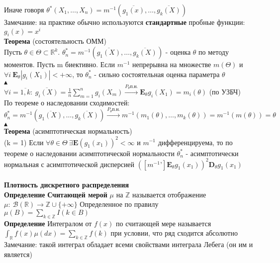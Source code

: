 \documentclass[25pt]{article}
\begin{document}
Иначе говоря $\theta^*(X_1,\dots,X_n) = m^{-1}(\overline{g_1(x)},\dots,\overline{g_k(X)})$\\
Замечание: на практике обычно используются \textbf{стандартные} пробные функции: $g_i(x) = x^i$\\
\textbf{Теорема} (состоятельность ОММ)\\
Пусть $\theta \in \Theta \subset \mathbb{R}^k$. $\theta^*_n = m^{-1}(\overline{g_1(X)},\dots,\overline{g_k(X)})$ - оценка $\theta$ по методу моментов.
Пусть m биективно. Если $m^{-1}$ непрерывна на множестве $m(\Theta)$ и $\forall i \ \textbf{E}_\theta |g_i(X_1)| < +\infty$, то $\theta^*_n$ - сильно состоятельная оценка параметра $\theta$
\\
$\blacktriangle$
\\
$\forall i = \overline{1,k}:\ \overline{g_i(X)} = \frac{1}{n}\sum_{m=1}^n g_i(X_m) \xrightarrow{P_\theta \text{п.н.}} \textbf{E}_\theta g_i(X_1) = m_i(\theta)$ (по УЗБЧ)\\
По теореме о наследовании сходимостей:\\
$\theta_n^* = m^{-1}(\overline{g_1(X)},\dots,\overline{g_k(X)}) \xrightarrow{P_\theta \text{п.н.}} m^{-1}(m_1(\theta),\dots,m_k(\theta)) = m^{-1}(m(\theta)) = \theta$
\\
$\blacktriangle$\\
\textbf{Теорема} (асимптотическая нормальность)\\
(k = 1) Если $\forall \theta \in \Theta \ \exists \textbf{E}(g_1(x_1))^2 < \infty$ и $m^{-1}$ 
дифференцируема, то по теореме о наследовании асимптотической нормальности $\theta_n^*$ - асимптотически нормальная с асимптотической дисперсией 
$ ( [ m^{-1} \text{'}]\mathbf{E}_\theta g_1(x_1))^2 \mathbf{D}_\theta g_1(x_1)$ 
\\ \\
\textbf{Плотность дискретного распределения}\\
\textbf{Определение} \textbf{Считающей мерой} $\mu$ на $\mathbb{Z}$ называется отображение
\\$\mu:\ \mathcal{B}(\mathbb{R}) \rightarrow \mathbb{Z}\cup\{+\infty\}$
Определенное по правилу\\
$\mu(B) = \sum_{k \in \mathbb{Z}}I(k\in B)$\\
\textbf{Определение} Интегралом от $f(x)$ по считающей мере называется $\int_\mathbb{R}f(x)\mu(dx) = \sum_{k\in\mathbb{Z}}f(k)$ при условии, что ряд сходится абсолютно\\
Замечание: такой интеграл обладает всеми свойствами интеграла Лебега (он им и является)\\
\end{document}
